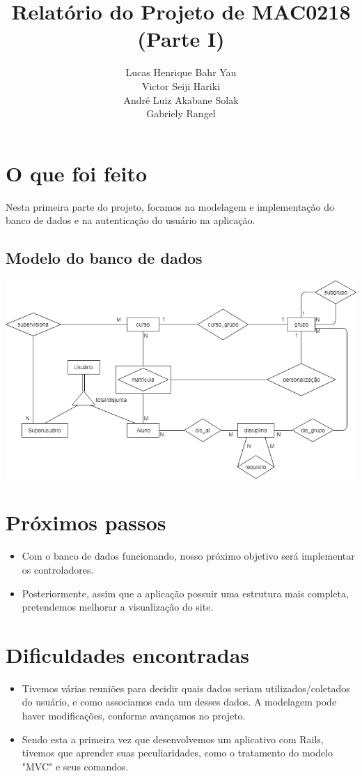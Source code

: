 \documentclass[12pt]{article}
\title{Relatório do Projeto de MAC0218 \\ (Parte I)}
\author
{
	Lucas Henrique Bahr Yau \\
	Victor Seiji Hariki\\
	André Luiz Akabane Solak\\
	Gabriely Rangel
}
\date{}
\begin{document}
	\maketitle
	
	\section*{O que foi feito}
	Nesta primeira parte do projeto, focamos na modelagem e implementação do banco de dados e na autenticação do usuário na aplicação.\\
	
	\subsection*{Modelo do banco de dados}
	\includegraphics[scale=0.5]{tec}
	
	\section*{Próximos passos}
	\begin{itemize}
	\item Com o banco de dados funcionando, nosso próximo objetivo será implementar os controladores.
	\item Posteriormente, assim que a aplicação possuir uma estrutura mais completa, pretendemos melhorar a visualização do site.
	\end{itemize}
	
	\section*{Dificuldades encontradas}
	\begin{itemize} 
	\item Tivemos várias reuniões para decidir quais dados seriam utilizados/coletados do usuário, e como associamos cada um desses dados. A modelagem pode haver modificações, conforme avançamos no projeto.\\
	\item Sendo esta a primeira vez que desenvolvemos um aplicativo com Rails, tivemos que aprender suas peculiaridades, como o tratamento do modelo "MVC" e seus comandos.
	\end{itemize}
	
	
\end{document}

